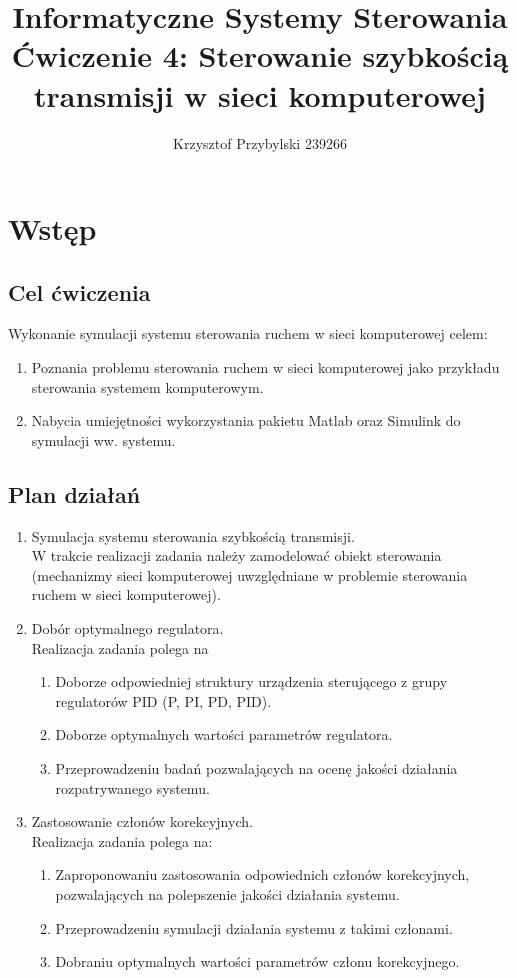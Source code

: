 \documentclass[a4paper,10pt]{article}
\title{Informatyczne Systemy Sterowania \\ \large Ćwiczenie 4: Sterowanie szybkością transmisji w sieci komputerowej}
\author{Krzysztof Przybylski 239266}
\begin{document}
\maketitle
\section{Wstęp}\label{sec:wstęp}
\subsection{Cel ćwiczenia}
Wykonanie symulacji systemu sterowania ruchem w sieci komputerowej celem: \\
\begin{enumerate}
	\item Poznania problemu sterowania ruchem w sieci komputerowej jako przykładu 
sterowania systemem komputerowym. 
	\item Nabycia umiejętności wykorzystania pakietu Matlab oraz Simulink do symulacji ww. systemu. 
\end{enumerate}
\subsection{Plan działań} 
\begin{enumerate}
	\item Symulacja systemu sterowania szybkością transmisji.
	\\W trakcie realizacji zadania należy zamodelować obiekt sterowania (mechanizmy sieci
	komputerowej uwzględniane w problemie sterowania ruchem w sieci komputerowej).
	
	\item Dobór optymalnego regulatora.
	\\Realizacja zadania polega na
	\begin{enumerate}
		
		\item Doborze odpowiedniej struktury urządzenia sterującego z grupy regulatorów PID (P,
		PI, PD, PID).	
		\item Doborze optymalnych wartości parametrów regulatora.
		\item Przeprowadzeniu badań pozwalających na ocenę jakości działania rozpatrywanego
		systemu.
	\end{enumerate}
	
	\item Zastosowanie członów korekcyjnych.
	\\Realizacja zadania polega na:
	\begin{enumerate}
		
		\item Zaproponowaniu zastosowania odpowiednich członów korekcyjnych, pozwalających
		na polepszenie jakości działania systemu.
		\item Przeprowadzeniu symulacji działania systemu z takimi członami.
		\item Dobraniu optymalnych wartości parametrów członu korekcyjnego.
	\end{enumerate}
\end{enumerate}
\end{document}
